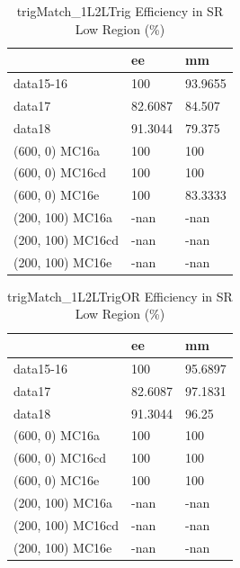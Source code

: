 \begin{table}
\begin{center}
\caption{trigMatch\_1L2LTrig Efficiency in SR Low Region (\%)}
\begin{tabular}{l|l|l}
& ee & mm \\
\hline
data15-16 & 100 & 93.9655 \\
data17 & 82.6087 & 84.507 \\
data18 & 91.3044 & 79.375 \\
(600, 0) MC16a & 100 & 100 \\
(600, 0) MC16cd & 100 & 100 \\
(600, 0) MC16e & 100 & 83.3333 \\
(200, 100) MC16a & -nan & -nan \\
(200, 100) MC16cd & -nan & -nan \\
(200, 100) MC16e & -nan & -nan
\label{tab:trigger_first}
\end{tabular}
\end{center}
\end{table}

\begin{table}
\begin{center}
\caption{trigMatch\_1L2LTrigOR Efficiency in SR Low Region (\%)}
\begin{tabular}{l|l|l}
& ee & mm \\
\hline
data15-16 & 100 & 95.6897 \\
data17 & 82.6087 & 97.1831 \\
data18 & 91.3044 & 96.25 \\
(600, 0) MC16a & 100 & 100 \\
(600, 0) MC16cd & 100 & 100 \\
(600, 0) MC16e & 100 & 100 \\
(200, 100) MC16a & -nan & -nan \\
(200, 100) MC16cd & -nan & -nan \\
(200, 100) MC16e & -nan & -nan \\
\end{tabular}
\end{center}
\end{table}

